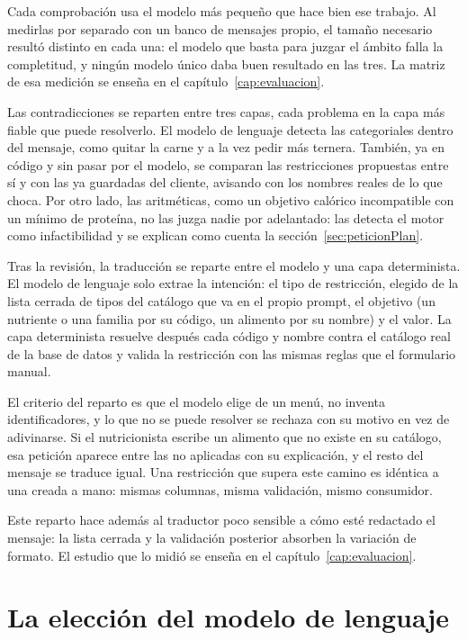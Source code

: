 Cada comprobación usa el modelo más pequeño que hace bien ese trabajo. Al medirlas por separado con un banco de mensajes propio, el tamaño necesario resultó distinto en cada una: el modelo que basta para juzgar el ámbito falla la completitud, y ningún modelo único daba buen resultado en las tres. La matriz de esa medición se enseña en el capítulo~\ref{cap:evaluacion}.

Las contradicciones se reparten entre tres capas, cada problema en la capa más fiable que puede resolverlo. El modelo de lenguaje detecta las categoriales dentro del mensaje, como quitar la carne y a la vez pedir más ternera. También, ya en código y sin pasar por el modelo, se comparan las restricciones propuestas entre sí y con las ya guardadas del cliente, avisando con los nombres reales de lo que choca. Por otro lado, las aritméticas, como un objetivo calórico incompatible con un mínimo de proteína, no las juzga nadie por adelantado: las detecta el motor como infactibilidad y se explican como cuenta la sección~\ref{sec:peticionPlan}.

Tras la revisión, la traducción se reparte entre el modelo y una capa determinista. El modelo de lenguaje solo extrae la intención: el tipo de restricción, elegido de la lista cerrada de tipos del catálogo que va en el propio prompt, el objetivo (un nutriente o una familia por su código, un alimento por su nombre) y el valor. La capa determinista resuelve después cada código y nombre contra el catálogo real de la base de datos y valida la restricción con las mismas reglas que el formulario manual.

El criterio del reparto es que el modelo elige de un menú, no inventa identificadores, y lo que no se puede resolver se rechaza con su motivo en vez de adivinarse. Si el nutricionista escribe un alimento que no existe en su catálogo, esa petición aparece entre las no aplicadas con su explicación, y el resto del mensaje se traduce igual. Una restricción que supera este camino es idéntica a una creada a mano: mismas columnas, misma validación, mismo consumidor.

Este reparto hace además al traductor poco sensible a cómo esté redactado el mensaje: la lista cerrada y la validación posterior absorben la variación de formato. El estudio que lo midió se enseña en el capítulo~\ref{cap:evaluacion}.

\section{La elección del modelo de lenguaje}
\label{sec:eleccionLLM}

